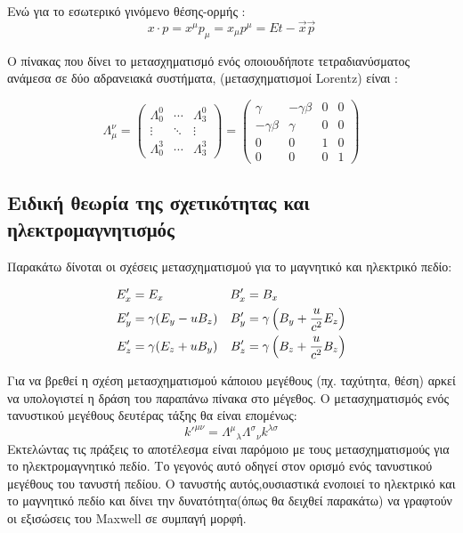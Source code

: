 Ενώ για το εσωτερικό γινόμενο θέσης-ορμής : 
\begin{equation}
  x\cdot p= x^\mu p_\mu =x_\mu p^\mu= Et-\vec{x}\vec{p}
\end{equation}

Ο πίνακας που δίνει το  μετασχηματισμό ενός οποιουδήποτε τετραδιανύσματος ανάμεσα σε δύο αδρανειακά συστήματα, (μετασχηματισμοί \textlatin{Lorentz}) είναι : 

\begin{equation}
  \Lambda_\mu ^\nu=
  \begin{pmatrix}
    \Lambda^0 _0  & \cdots & \Lambda^0 _3 \\
    \vdots & \ddots & \vdots \\
    \Lambda^3 _0  & \cdots & \Lambda^3 _3
  \end{pmatrix}
  =
  \begin{pmatrix}
    \gamma & -\gamma \beta& 0 & 0 \\
    -\gamma \beta & \gamma & 0 & 0 \\
    0 & 0 & 1 & 0 \\
    0 & 0 & 0 & 1
  \end{pmatrix} 
\end{equation}

\subsection{Ειδική θεωρία της σχετικότητας και ηλεκτρομαγνητισμός }
Παρακάτω δίνοται οι σχέσεις μετασχηματισμού για το μαγνητικό και ηλεκτρικό πεδίο:

\begin{align*} 
  E'_x &= E_x        & B'_x &= B_x   
  \\E'_y &= \gamma(E_y-u B_z)         & B'_y &= \gamma \left(  B_y+\frac{u}{c^2}E_z \right)   
  \\E'_z &= \gamma(E_z+u B_y)        & B'_z &= \gamma \left(  B_z+\frac{u}{c^2}B_z \right)    
\end{align*} 

Για να βρεθεί η σχέση μετασχηματισμού κάποιου μεγέθους (πχ. ταχύτητα, θέση) αρκεί να υπολογιστεί η δράση του παραπάνω πίνακα στο μέγεθος. Ο μετασχηματισμός ενός τανυστικού μεγέθους δευτέρας τάξης θα είναι επομένως:
\[
k'^{\mu \nu}= {\Lambda^{\mu}}_{\lambda} {\Lambda^{\sigma}}_{\nu} k^{\lambda \sigma} 
\]
Εκτελώντας τις πράξεις το αποτέλεσμα είναι παρόμοιο με τους μετασχηματισμούς για το ηλεκτρομαγνητικό πεδίο. Το γεγονός αυτό οδηγεί στον ορισμό ενός τανυστικού μεγέθους του τανυστή πεδίου. Ο τανυστής αυτός,ουσιαστικά ενοποιεί το ηλεκτρικό και το μαγνητικό πεδίο και δίνει την δυνατότητα(όπως θα δειχθεί παρακάτω) να γραφτούν οι εξισώσεις του \textlatin{Maxwell} σε συμπαγή μορφή.

